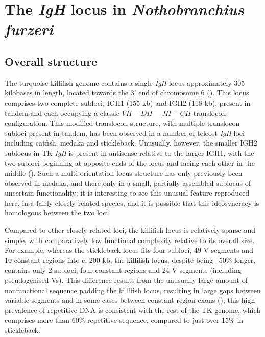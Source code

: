 \section{The \textit{IgH} locus in \textit{Nothobranchius furzeri}}
\label{sec:nfu-locus}


	\subsection{Overall structure}
	\label{sec:nfu-locus-structure}
	
	The turquoise killifish genome contains a single \textit{IgH} locus approximately 305 kilobases in length, located towards the 3' end of chromosome 6 ().
	This locus comprises two complete subloci, IGH1 (155 kb) and IGH2 (118 kb), present in tandem and each occupying a classic ${VH-DH-JH-CH}$ translocon configuration. This modified translocon structure, with multiple translocon subloci present in tandem, has been observed in a number of teleost \textit{IgH} loci including catfish, medaka and stickleback. Unusually, however, the smaller IGH2 sublocus in TK \textit{IgH} is present in antisense relative to the larger IGH1, with the two subloci beginning at opposite ends of the locus and facing each other in the middle (). Such a multi-orientation locus structure has only previously been observed in medaka, and there only in a small, partially-assembled sublocus of uncertain functionality; it is interesting to see this unusual feature reproduced here, in a fairly closely-related species, and it is possible that this ideosyncracy is homologous between the two loci. %
	
	Compared to other closely-related loci, the killifish locus is relatively sparse and simple, with comparatively low functional complexity relative to its overall size. For example, whereas the stickleback locus fits four subloci, 49 V segments and 10 constant regions into c. 200 kb, the killifish locus, despite being ~50\% longer, contains only 2 subloci, four constant regions and 24 V segments (including pseudogenised Vs). This difference results from the unusually large amount of nonfunctional sequence padding the killifish locus, resulting in large gaps between variable segments and in some cases between constant-region exons (); this high prevalence of repetitive DNA is consistent with the rest of the TK genome, which comprises more than 60\% repetitive sequence, compared to just over 15\% in stickleback.
	
